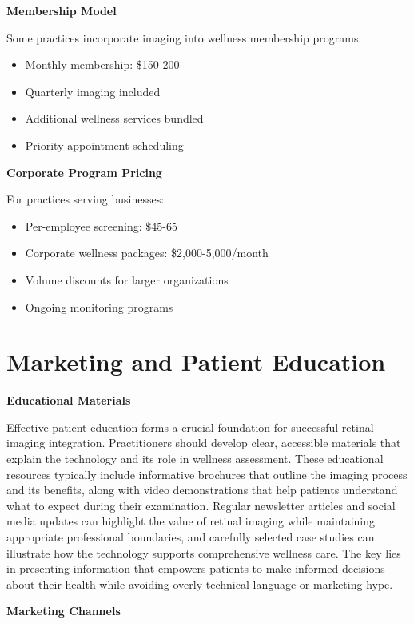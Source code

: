 \documentclass[
  Letterpaper,
]{scrbook}
\providecommand{\tightlist}{%
  \setlength{\itemsep}{0pt}\setlength{\parskip}{0pt}}\usepackage{longtable,booktabs,array}
\begin{document}
\textbf{Membership Model}

Some practices incorporate imaging into wellness membership programs:

\begin{itemize}
\tightlist
\item
  Monthly membership: \$150-200
\item
  Quarterly imaging included
\item
  Additional wellness services bundled
\item
  Priority appointment scheduling
\end{itemize}

\textbf{Corporate Program Pricing}

For practices serving businesses:

\begin{itemize}
\tightlist
\item
  Per-employee screening: \$45-65
\item
  Corporate wellness packages: \$2,000-5,000/month
\item
  Volume discounts for larger organizations
\item
  Ongoing monitoring programs
\end{itemize}

\section{Marketing and Patient
Education}\label{marketing-and-patient-education}

\textbf{Educational Materials}

Effective patient education forms a crucial foundation for successful
retinal imaging integration. Practitioners should develop clear,
accessible materials that explain the technology and its role in
wellness assessment. These educational resources typically include
informative brochures that outline the imaging process and its benefits,
along with video demonstrations that help patients understand what to
expect during their examination. Regular newsletter articles and social
media updates can highlight the value of retinal imaging while
maintaining appropriate professional boundaries, and carefully selected
case studies can illustrate how the technology supports comprehensive
wellness care. The key lies in presenting information that empowers
patients to make informed decisions about their health while avoiding
overly technical language or marketing hype.

\textbf{Marketing Channels}
\end{document}
